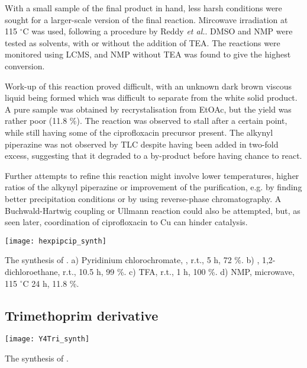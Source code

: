 With a small sample of the final product in hand, less harsh conditions were sought for a larger-scale version of the final reaction. Mircowave irradiation at 115 $^{\circ}$C was used, following a procedure by Reddy \textit{et al.}\cite{Reddy2001}. DMSO and NMP were tested as solvents, with or without the addition of TEA. The reactions were monitored using LCMS, and NMP without TEA was found to give the highest conversion. 

Work-up of this reaction proved difficult, with an unknown dark brown viscous liquid being formed which was difficult to separate from the white solid product. A pure sample was obtained by recrystalisation from EtOAc, but the yield was rather poor (11.8 \%). The reaction was observed to stall after a certain point, while still having some of the ciprofloxacin precursor  present. The alkynyl piperazine  was not observed by TLC despite having been added in two-fold excess, suggesting that it degraded to a by-product before having chance to react. 

Further attempts to refine this reaction might involve lower temperatures, higher ratios of the alkynyl piperazine  or improvement of the purification, e.g. by finding better precipitation conditions or by using reverse-phase chromatography. A Buchwald-Hartwig coupling or Ullmann reaction could also be attempted, but, as seen later, coordination of ciprofloxacin to Cu can hinder catalysis.

\begin{scheme}[H]
	\begin{center}
		\texttt{[image: hexpipcip\_synth]}
		\caption{The synthesis of . 
		a) Pyridinium chlorochromate, , r.t., 5 h, 72 \%.
		b) , 1,2-dichloroethane, r.t., 10.5 h, 99 \%.
		c) TFA, r.t., 1 h, 100 \%.
		d) NMP, microwave, 115 $^{\circ}$C 24 h, 11.8 \%.
		\label{sch:hexpipcip_synth}}
	\end{center}
\end{scheme}

\subsection{Trimethoprim derivative}

\begin{scheme}[H]
	\begin{center}
		\texttt{[image: Y4Tri\_synth]}
		\caption{The synthesis of .\label{sch:Y4Tri_synth}}
	\end{center}
\end{scheme}

